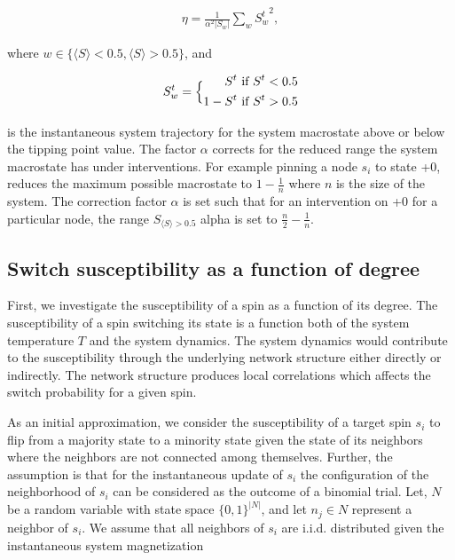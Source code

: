 \documentclass[a4paper, 11pt, twocolumn]{article}
\begin{document}
\begin{equation*}
\label{eq:noise}
\begin{split}
\eta = \frac{1}{\alpha^2 |S_{w}|}  \sum_w {S_w^t}^2,
\end{split}
\end{equation*}


where \(w \in \{\langle S \rangle < 0.5,\langle S \rangle > 0.5\}\), and

\begin{equation}
\label{eq:noise_estimation}
S_{w}^{t} = \Bigl\{\begin{aligned}
    S^t & \textrm{ if } S^t < 0.5 \\
    1 - S^t & \textrm{ if } S^t > 0.5
    \end{aligned}
\end{equation}

is the instantaneous system trajectory for the system macrostate above
or below the tipping point value. The factor \(\alpha\) corrects for the
reduced range the system macrostate has under interventions. For example
pinning a node \(s_i\) to state +0, reduces the maximum possible
macrostate to \(1 - \frac{1}{n}\) where \(n\) is the size of the system.
The correction factor \(\alpha\) is set such that for an intervention on
+0 for a particular node, the range \(S_{\langle S \rangle > 0.5}\)
alpha is set to \(\frac{n}{2} - \frac{1}{n}\).

\subsection{Switch susceptibility as a function of degree}
\label{sec:org009e10c}
First, we investigate the susceptibility of a spin as a function of its
degree. The susceptibility of a spin switching its state is a function
both of the system temperature \(T\) and the system dynamics. The system
dynamics would contribute to the susceptibility through the underlying
network structure either directly or indirectly. The network structure
produces local correlations which affects the switch probability for a
given spin.

As an initial approximation, we consider the susceptibility of a target
spin \(s_i\) to flip from a majority state to a minority state given the
state of its neighbors where the neighbors are not connected among
themselves. Further, the assumption is that for the instantaneous update
of \(s_i\) the configuration of the neighborhood of \(s_i\) can be
considered as the outcome of a binomial trial. Let, \(N\) be a random
variable with state space \(\{0,  1\}^{|N|}\), and let \(n_j \in N\)
represent a neighbor of \(s_i\). We assume that all neighbors of \(s_i\)
are i.i.d. distributed given the instantaneous system magnetization
\end{document}
